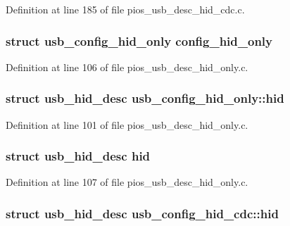 \-Definition at line 185 of file pios\-\_\-usb\-\_\-desc\-\_\-hid\-\_\-cdc.\-c.

\hypertarget{group___p_i_o_s___u_s_b___d_e_s_c_ga4729f56193bb7fb5a7c5115995ec85db}{
\subsubsection[{config\-\_\-hid\-\_\-only}]{\setlength{\rightskip}{0pt plus 5cm}struct {\bf usb\-\_\-config\-\_\-hid\-\_\-only} {\bf config\-\_\-hid\-\_\-only}}}\label{group___p_i_o_s___u_s_b___d_e_s_c_ga4729f56193bb7fb5a7c5115995ec85db}


\-Definition at line 106 of file pios\-\_\-usb\-\_\-desc\-\_\-hid\-\_\-only.\-c.

\hypertarget{group___p_i_o_s___u_s_b___d_e_s_c_ga279cdc579474d229bf1bb7963f423423}{
\subsubsection[{hid}]{\setlength{\rightskip}{0pt plus 5cm}struct {\bf usb\-\_\-hid\-\_\-desc} {\bf usb\-\_\-config\-\_\-hid\-\_\-only\-::hid}}}\label{group___p_i_o_s___u_s_b___d_e_s_c_ga279cdc579474d229bf1bb7963f423423}


\-Definition at line 101 of file pios\-\_\-usb\-\_\-desc\-\_\-hid\-\_\-only.\-c.

\hypertarget{group___p_i_o_s___u_s_b___d_e_s_c_ga6eb333cd7c6d156f25fa827aa085579c}{
\subsubsection[{hid}]{\setlength{\rightskip}{0pt plus 5cm}struct {\bf usb\-\_\-hid\-\_\-desc} {\bf hid}}}\label{group___p_i_o_s___u_s_b___d_e_s_c_ga6eb333cd7c6d156f25fa827aa085579c}


\-Definition at line 107 of file pios\-\_\-usb\-\_\-desc\-\_\-hid\-\_\-only.\-c.

\hypertarget{group___p_i_o_s___u_s_b___d_e_s_c_ga8b4c52ed5995d3193869596bc47a4e58}{
\subsubsection[{hid}]{\setlength{\rightskip}{0pt plus 5cm}struct {\bf usb\-\_\-hid\-\_\-desc} {\bf usb\-\_\-config\-\_\-hid\-\_\-cdc\-::hid}}}\label{group___p_i_o_s___u_s_b___d_e_s_c_ga8b4c52ed5995d3193869596bc47a4e58}


